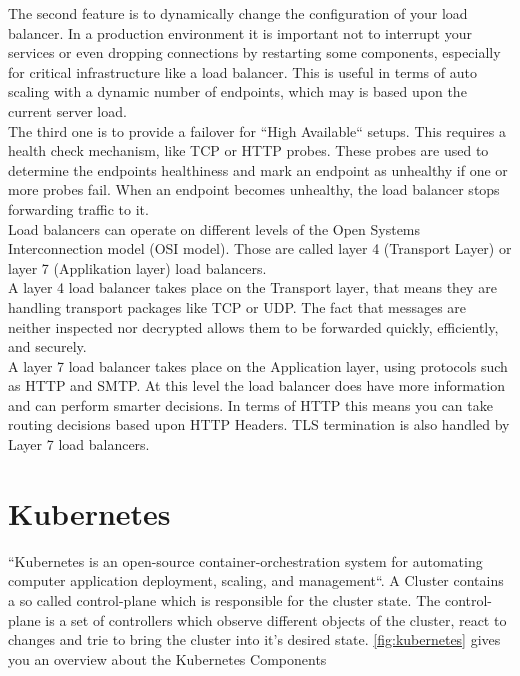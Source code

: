 The second feature is to dynamically change the configuration of your load balancer.
In a production environment it is important not to interrupt your services or even dropping connections by restarting some components, especially for critical infrastructure like a load balancer.
This is useful in terms of auto scaling with a dynamic number of endpoints, which may is based upon the current server load.
\\
The third one is to provide a failover for ``High Available`` setups.
This requires a health check mechanism, like TCP or HTTP probes.
These probes are used to determine the endpoints healthiness and mark an endpoint as unhealthy if one or more probes fail.
When an endpoint becomes unhealthy, the load balancer stops forwarding traffic to it.
\\
Load balancers can operate on different levels of the Open Systems Interconnection model (OSI model).
Those are called layer 4 (Transport Layer) or layer 7 (Applikation layer) load balancers.
\\
A layer 4 load balancer takes place on the Transport layer, that means they are handling transport packages like TCP or UDP.
The fact that messages are neither inspected nor decrypted allows them to be forwarded quickly, efficiently, and securely.
\\
A layer 7 load balancer takes place on the Application layer, using protocols such as HTTP and SMTP.
At this level the load balancer does have more information and can perform smarter decisions.
In terms of HTTP this means you can take routing decisions based upon HTTP Headers.
TLS termination is also handled by Layer 7 load balancers.~\cite{NICHOLSON-LOAD-BALANCING}

\section{Kubernetes}

``Kubernetes is an open-source container-orchestration system for automating computer application deployment, scaling, and management``\cite{Kubernetes}.
A Cluster contains a so called control-plane which is responsible for the cluster state.
The control-plane is a set of controllers which observe different objects of the cluster, react to changes and trie to bring the cluster into it's desired state.
\autoref{fig:kubernetes} gives you an overview about the Kubernetes Components

